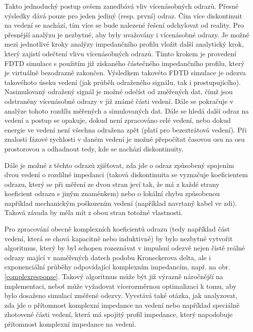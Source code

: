Takto jednoduchý postup ovšem zanedbává vliv vícenásobných odrazů. Přesné výsledky dává pouze pro jeden jediný (resp. první) odraz. Čím více diskontinuit na vedení se nachází, tím více se bude nalezené řešení odchylovat od reality. Pro přesnější analýzu je nezbytné, aby byly uvažovány i vícenásobné odrazy. Je možné mezi jednotlivé kroky analýzy impedančního profilu vložit další analytický krok, který zajistí odečtení vlivu vícenásobných odrazů. Tímto krokem je provedení \acrshort{FDTD} simulace s použitím již získaného částečného impedančního profilu, který je virtuálně bezodrazně zakončen. Výsledkem takovéto \acrshort{FDTD} simulace je odezva takovéhoto úseku vedení (jak průběh odraženého signálu, tak i prostupujícího). Nasimulovaný odražený signál je možné odečíst od změřených dat, čímž jsou odstraněny vícenásobné odrazy v již známé části vedení. Dále se pokračuje v analýze tohoto rozdílu měřených a simulovaných dat. Dále se hledá další odraz na vedení a postup se opakuje, dokud není zpracováno celé vedení, nebo dokud energie ve vedení není všechna odražena zpět (platí pro bezeztrátová vedení). Při znalosti fázové rychlosti v daném vedení je možné přepočítat časovou osu na osu prostorovou a odhadnout tedy, kde se nachází diskontinuity.

Dále je možné z těchto odrazů zjišťovat, zda jde o odraz způsobený spojením dvou vedení o rozdílné impedanci (taková diskontinuita se vyznačuje koeficientem odrazu, který se při měření ze dvou stran jeví tak, že má z každé strany koeficient odrazu s jiným znaménkem) nebo o lokální chybu způsobenou například mechanickým poškozením vedení (například navrtaný kabel ve zdi). Taková závada by měla mít z obou stran totožné vlastnosti.

Pro zpracování obecně komplexních koeficientů odrazu (tedy například část vedení, která se chová kapacitně nebo induktivně) by bylo nezbytné vytvořit algoritmus, který by byl schopen rozeznávat v impulsní odezvě nejen čistě reálné odrazy mající v naměřených datech podobu Kroneckerova delta, ale i exponenciální průběhy odpovídající komplexním impedancím, např. na obr. \ref{complexresponse}. Takový algoritmus může být již výrazně náročnější na implementaci, neboť může vyžadovat vícerozměrnou optimalizaci k tomu, aby bylo dosaženo simulací změřené odezvy. Vyvstává také otázka, jak analyzovat, zda jde o přítomnost komplexní impedance na vedení nebo například speciálně zhotovené části vedení, která má spojitý profil impedance, který napodobuje přítomnost komplexní impedance na vedení.

